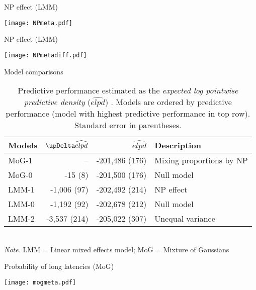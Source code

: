 
\begin{frame}{NP effect (LMM)}
	\begin{flushright}
		\texttt{[image: NPmeta.pdf]}
	\end{flushright}
\end{frame}


\begin{frame}{NP effect (LMM)}
	\begin{flushright}	
		\texttt{[image: NPmetadiff.pdf]}
	\end{flushright}
\end{frame}



\begin{frame}{Model comparisons}
\begin{scriptsize}
	\begin{table}[ht]
	\centering
	\caption{\scriptsize{Predictive performance estimated as the \textit{expected log pointwise predictive density} ($\widehat{elpd}$) \parencite{vehtari2015pareto, vehtari2017practical}. Models are ordered by predictive performance (model with highest predictive performance in top row)}. Standard error in parentheses.}
		\begin{tabular}{lrrl}
		\toprule
		Models & $\updel\widehat{elpd}$ & $\widehat{elpd}$ & Description \\ [1ex]
		\midrule
		\rowcolor{yellow!40!white}MoG-1 & -- & -201,486 (176) & Mixing proportions by NP \\ [1ex]
  		MoG-0 & -15 (8) & -201,500 (176)  & Null model \\ [1ex]
 		\rowcolor{yellow!40!white}LMM-1 & -1,006 (97) & -202,492 (214) & NP effect \\ [1ex]
  		LMM-0 & -1,192 (92) & -202,678 (212) & Null model \\ [1ex]
 		LMM-2 & -3,537 (214) & -205,022 (307) & Unequal variance \\ [1ex]
		\bottomrule
		\end{tabular}\\
		\textit{Note.} LMM = Linear mixed effects model; MoG = Mixture of Gaussians 
	\end{table}
\end{scriptsize}
\end{frame}



\begin{frame}{Probability of long latencies (MoG)}

	\begin{flushright}
		\texttt{[image: mogmeta.pdf]}
	\end{flushright}


\end{frame}
